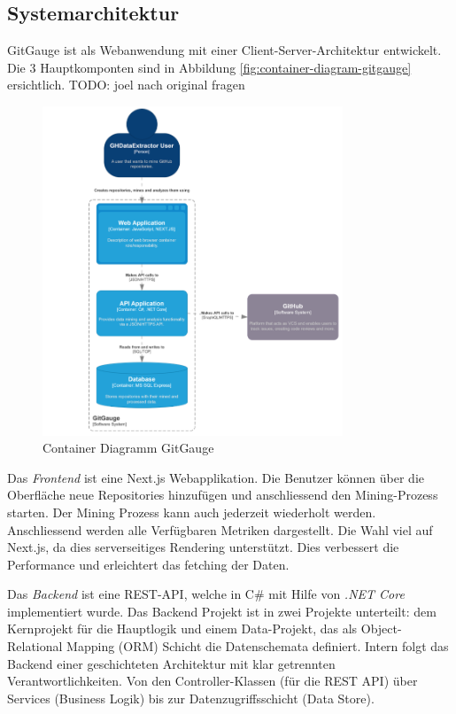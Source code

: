 \subsection{Systemarchitektur}
GitGauge ist als Webanwendung mit einer Client-Server-Architektur entwickelt. Die 3 Hauptkomponten sind in Abbildung \autoref{fig:container-diagram-gitgauge} ersichtlich. 
TODO: joel nach original fragen
\begin{figure}[htbp]
    \centering
    \includegraphics[width=0.8\textwidth]{Figures/container-diagram-gitgauge.png}
    \caption{Container Diagramm GitGauge \parencite{grand_joel_vt1_joelgrand_repository_2024}}
    \label{fig:container-diagram-gitgauge}
\end{figure}

Das \textit{Frontend} ist eine Next.js Webapplikation. Die Benutzer können über die Oberfläche neue Repositories hinzufügen und anschliessend den Mining-Prozess starten. Der Mining Prozess kann auch jederzeit wiederholt werden. Anschliessend werden alle Verfügbaren Metriken dargestellt. Die Wahl viel auf Next.js, da dies serverseitiges Rendering unterstützt. Dies verbessert die Performance und erleichtert das fetching der Daten. \parencite{grand_joel_vt1_joelgrand_repository_2024}

Das \textit{Backend} ist eine REST-API, welche in C\# mit Hilfe von \textit{.NET Core} implementiert wurde. Das Backend Projekt ist in zwei Projekte unterteilt: dem Kernprojekt für die Hauptlogik und einem Data-Projekt, das als Object-Relational Mapping (ORM) Schicht die Datenschemata definiert. Intern folgt das Backend einer geschichteten Architektur mit klar getrennten Verantwortlichkeiten. Von den Controller-Klassen (für die REST API) über Services (Business Logik) bis zur Datenzugriffsschicht (Data Store). \parencite{grand_joel_vt1_joelgrand_repository_2024}

